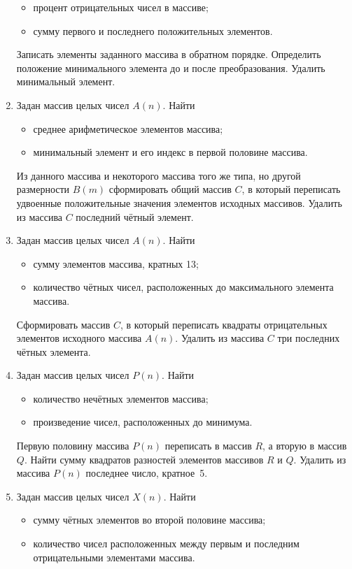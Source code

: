 \begin{enumerate}
\begin{itemize}
\item процент отрицательных чисел в массиве;
\item сумму первого и последнего положительных элементов.
\end{itemize}
Записать элементы заданного массива в обратном порядке. Определить положение минимального элемента до и после
преобразования. Удалить минимальный элемент.
\item Задан массив целых чисел $A(n)$. Найти
\begin{itemize}
\item среднее арифметическое элементов массива;
\item минимальный элемент и его индекс в первой половине массива.
\end{itemize}
Из данного массива и некоторого массива того же типа, но другой размерности $B(m)$
сформировать общий массив $C$, в который переписать удвоенные положительные значения элементов исходных
массивов. Удалить из массива $C$ последний чётный элемент.
\item Задан массив целых чисел $A(n)$. Найти
\begin{itemize}
\item сумму элементов массива, кратных 13;
\item количество чётных чисел, расположенных до максимального элемента массива.
\end{itemize}
Сформировать массив $C$, в который переписать квадраты отрицательных элементов исходного массива
$A(n)$. Удалить из массива $C$ три последних чётных элемента.
\item Задан массив целых чисел $P(n)$. Найти
\begin{itemize}
\item количество нечётных элементов массива;
\item произведение чисел, расположенных до минимума.
\end{itemize}
Первую половину массива $P(n)$ переписать в массив $R$, а вторую в
массив $Q$. Найти сумму квадратов разностей элементов массивов $R$ и
$Q$. Удалить из массива $P(n)$ последнее число, кратное~5.
\item Задан массив целых чисел $X(n)$. Найти
\begin{itemize}
\item сумму чётных элементов во второй половине массива;
\item количество чисел расположенных между первым и последним отрицательными элементами массива.
\end{itemize}

\end{enumerate}
